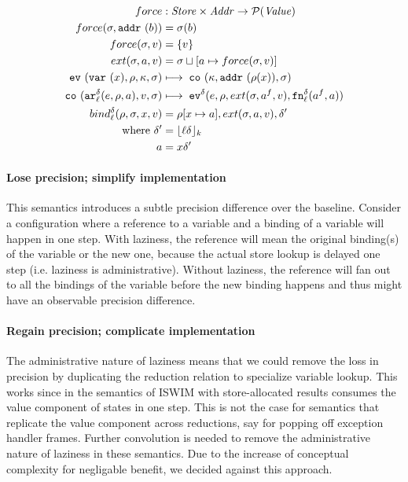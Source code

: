 \documentclass[preprint,onecolumn,9pt]{sigplanconf} %
\begin{document}
\begin{align*}
force &: \Store \times \Addr \to \Set(\Value) \\
force(\msto,\saddr\maddralt) &= \msto(\maddralt)\\
force(\msto,\mval) &= \{\mval\} \\
ext(\msto, \maddr, \mval) &= \msto \sqcup[\maddr \mapsto force(\msto, \mval)] \\
\ev{\svar{\mvar},\menv,\mkont,\msto} &\machstep\;
\co{\mkont,\saddr{\menv(\mvar)},\msto} \\
\co{\kar[^\mcntr_\mlab]{\mexp,\menv,\maddr},\mval,\msto}
&\machstep\;
\ev[^\mcntr]{\mexp,\menv,ext(\msto, \maddr^f,\mval),\kfn[^\mcntr_\mlab]{\maddr^f,\maddr}} \\
bind^\mcntr_\mlab(\menv,\msto,\mvar,\mval) &= \menv[\mvar \mapsto
  \maddr], ext(\msto,\maddr, \mval), \mcntr' \\
\mbox{where } \mcntr' &= \lfloor\mlab\mcntr\rfloor_k \\
              \maddr &= \mvar\mcntr'
\end{align*}

\paragraph{Lose precision; simplify implementation}
This semantics introduces a subtle precision difference over the
baseline. Consider a configuration where a reference to a variable and
a binding of a variable will happen in one step. With laziness, the
reference will mean the original binding(s) of the variable or the new
one, because the actual store lookup is delayed one step
(i.e. laziness is administrative). Without laziness, the reference
will fan out to all the bindings of the variable before the new
binding happens and thus might have an observable precision
difference.

\paragraph{Regain precision; complicate implementation}
The administrative nature of laziness means that we could remove the
loss in precision by duplicating the reduction relation to specialize
variable lookup. This works since in the semantics of ISWIM with
store-allocated results consumes the value component of states in one
step. This is not the case for semantics that replicate the value
component across reductions, say for popping off exception handler
frames. Further convolution is needed to remove the administrative
nature of laziness in these semantics. Due to the increase of
conceptual complexity for negligable benefit, we decided against this
approach.
\end{document}
